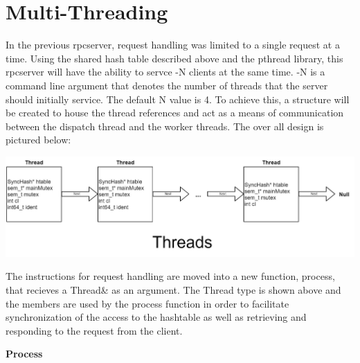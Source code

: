 \documentclass[11pt,letterpaper]{article}
\begin{document}
\section{Multi-Threading}

In the previous rpcserver, request handling was limited to a single request at a time. Using the shared hash table described above and the pthread library, this rpcserver will have the ability to servce -N clients at the same time. -N is a command line argument that denotes the number of threads that the server should initially service. The default N value is 4. To achieve this, a structure will be created to house the thread references and act as a means of communication between the dispatch thread and the worker threads. The over all design is pictured below:
\begin{center}
\includegraphics[scale=.25]{resources/threads.jpg}
\end{center}

The instructions for request handling are moved into a new function, process, that recieves a Thread\& as an argument. The Thread type is shown above and the members are used by the process function in order to facilitate synchronization of the access to the hashtable as well as retrieving and responding to the request from the client.

\begin{center}

\textbf{\footnotesize{Process}}
\end{center}


\end{document}
